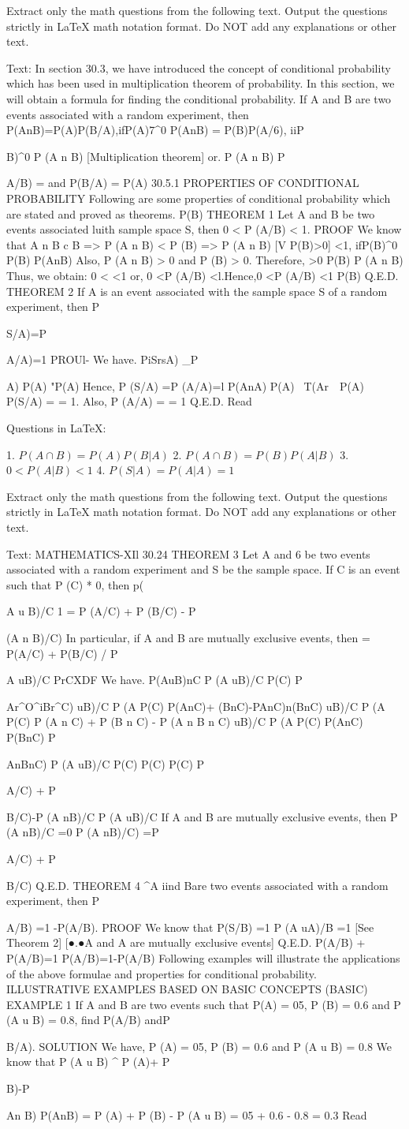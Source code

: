 Extract only the math questions from the following text.
Output the questions strictly in LaTeX math notation format.
Do NOT add any explanations or other text.

Text:
In section 30.3, we have introduced the concept of conditional probability which has been used
in multiplication theorem of probability. In this section, we will obtain a formula for finding the
conditional probability.
If A and B are two events associated with a random experiment, then
P(AnB)=P(A)P(B/A),ifP(A)7^0
P(AnB) = P(B)P(A/6), iiP{B)^0
P (A n B)
[Multiplication theorem]
or.
P (A n B)
P{A/B) =
and P(B/A) =
P(A)
30.5.1
PROPERTIES OF CONDITIONAL PROBABILITY
Following are some properties of conditional probability which are stated and proved as
theorems.
P(B)
THEOREM 1
Let A and B be two events associated luith sample space S, then 0 < P (A/B) < 1.
PROOF
We know that
A n B c B => P (A n B) < P (B) => P (A n B)
[V P(B)>0]
<1, ifP(B)^0
P(B)
P(AnB)
Also,
P (A n B) > 0 and P (B) > 0. Therefore,
>0
P(B)
P (A n B)
Thus, we obtain:
0
<
<1
or, 0 <P (A/B) <l.Hence,0 <P (A/B) <1
P(B)
Q.E.D.
THEOREM 2
If A is an event associated with the sample space S of a random experiment, then
P{S/A)=P{A/A)=1
PROUl-
We have.
PiSrsA) _P{A)
P(A)
"P(A)
Hence,
P (S/A) =P (A/A)=l
P(AnA)
P(A)
~T(Ar~~P(A)
P(S/A) =
= 1. Also, P (A/A) =
= 1
Q.E.D.
Read

Questions in LaTeX:

1. $P(A \cap B) = P(A)P(B|A)$
2. $P(A \cap B) = P(B)P(A|B)$
3. $0 < P(A|B) < 1$
4. $P(S|A) = P(A|A) = 1$

Extract only the math questions from the following text.
Output the questions strictly in LaTeX math notation format.
Do NOT add any explanations or other text.

Text:
MATHEMATICS-XIl
30.24
THEOREM 3
Let A and 6 be two events associated with a random experiment and S be the sample space.
If C is an event such that P (C) * 0, then
p({A u B)/C 1 = P (A/C) + P (B/C) - P {(A n B)/C)
In particular, if A and B are mutually exclusive events, then
= P(A/C) + P(B/C)
/
P
{A uB)/C
PrCXDF
We have.
P{(AuB)nC}
P
(A uB)/C
P(C)
P {{Ar^O^iBr^C)}
uB)/C
P
(A
P(C)
P(AnC)+ (BnC)-P{AnC)n(BnC)}
uB)/C
P
(A
P(C)
P (A n C) + P (B n C) - P (A n B n C)
uB)/C
P
(A
P(C)
P(AnC)
P(BnC)
P{AnBnC)
P
(A uB)/C
P(C)
P(C)
P(C)
P{A/C) + P{B/C)-P
(A nB)/C
P
(A uB)/C
If A and B are mutually exclusive events, then P
(A nB)/C
=0
P
(A nB)/C)
=P{A/C) + P{B/C)
Q.E.D.
THEOREM 4 ^A iind Bare two events associated with a random experiment, then P{A/B) =1 -P(A/B).
PROOF
We know that
P(S/B) =1
P
(A uA)/B
=1
[See Theorem 2]
[●.●A and A are mutually exclusive events]
Q.E.D.
P(A/B) + P(A/B)=1
P(A/B)=1-P(A/B)
Following examples will illustrate the applications of the above formulae and properties for
conditional probability.
ILLUSTRATIVE EXAMPLES
BASED ON BASIC CONCEPTS (BASIC)
EXAMPLE 1
If A and B are two events such that P(A) = 05, P (B) = 0.6 and P (A u B) = 0.8, find
P(A/B) andP{B/A).
SOLUTION
We have, P (A) = 05, P (B) = 0.6 and P (A u B) = 0.8
We know that
P (A u B) ^ P (A)+ P{B)-P {An B)
P(AnB) = P (A) + P (B) - P (A u B) = 05 + 0.6 - 0.8 = 0.3
Read

}}}}}}}}}}}}}}}}}}
